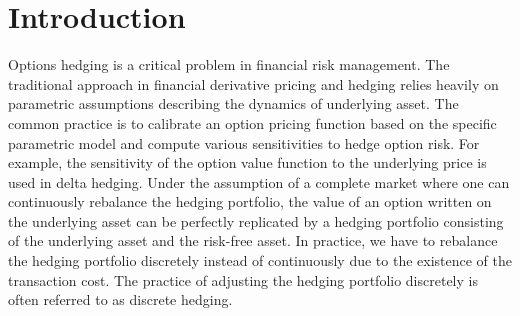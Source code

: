 \documentclass[letterpaper,12pt,titlepage,oneside,final]{book}
\numberwithin{equation}{section}
\theoremstyle{definition}
\begin{document}


\chapter{Introduction}
Options hedging is a critical problem in financial risk management. The traditional approach in financial derivative pricing and hedging relies heavily on parametric assumptions describing the dynamics of underlying asset.  The common practice is to calibrate an option pricing function based on the specific parametric model and compute various sensitivities to hedge option risk. For example, the sensitivity of the option value function to the underlying price is used in delta hedging. Under the assumption of a complete market \cite{shreve2004stochastic} where one can continuously rebalance the hedging portfolio, the value of an option written on the underlying asset can be perfectly replicated by a hedging portfolio consisting of the underlying asset and the  risk-free asset.  In practice, we have to rebalance the hedging portfolio discretely instead of continuously due to the existence of the transaction cost.  The practice of adjusting the hedging portfolio discretely is often referred to as discrete hedging.
\end{document}
